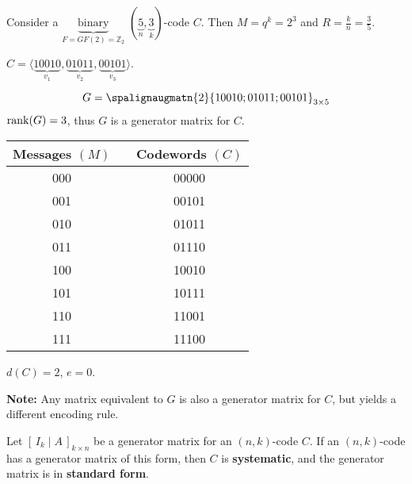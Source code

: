 


\begin{exbox}
    \begin{example}
        Consider a $ \underbrace{\text{binary}}_{F=GF(2)=\mathbb{Z}_2} $
        $ (\underbrace{5}_{n},\underbrace{3}_{k}) $-code $ C $. Then
        $ M=q^k=2^3 $ and $ R=\frac{k}{n} =\frac{3}{5} $.

        $ C=\langle \underbrace{10010}_{v_1},\underbrace{01011}_{v_2},\underbrace{00101}_{v_3} \rangle$.

        \[ G=
            \spalignaugmatn{2}{
                1 0 0 1 0; 0 1 0 1 1; 0 0 1 0 1}_{3\times{}5}
        \]
        $ \operatorname{rank}(G)=3 $, thus $ G $ is a generator matrix for $ C $.

        \begin{table}[H]
            \centering
            \begin{tabular}{@{}ccc@{}}
                Messages $ (M) $ & \textrightarrow{} & Codewords $ (C) $ \\
                \midrule
                000              & \textrightarrow{} & 00000             \\
                001              & \textrightarrow{} & 00101             \\
                010              & \textrightarrow{} & 01011             \\
                011              & \textrightarrow{} & 01110             \\
                100              & \textrightarrow{} & 10010             \\
                101              & \textrightarrow{} & 10111             \\
                110              & \textrightarrow{} & 11001             \\
                111              & \textrightarrow{} & 11100
            \end{tabular}
        \end{table}
        $ d(C)=2 $, $ e=0 $.
    \end{example}
\end{exbox}

\textbf{Note:} Any matrix equivalent to $ G $ is also a generator matrix
for $ C $, but yields a different encoding rule.

\begin{defbox}
    \begin{definition}
        Let $ \left[\, I_k\mid A \,\right]_{k\times n} $ be a generator matrix
        for an $ (n,k) $-code $ C $. If an $ (n,k) $-code has a generator
        matrix of this form, then $ C $ is \textbf{systematic}, and the generator
        matrix is in \textbf{standard form}.
    \end{definition} \end{defbox}

